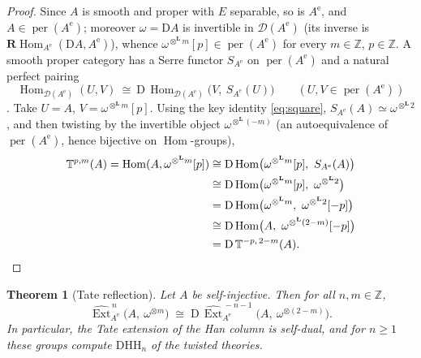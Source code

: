 \documentclass[11pt]{amsart}
\newtheorem{theorem}{Theorem}[section]
\theoremstyle{definition}
\newcommand{\T}{\mathbb{T}}
\newcommand{\HH}{\mathrm{HH}}
\newcommand{\D}{\mathrm{D}}
\newcommand{\sExt}{\widehat{\operatorname{Ext}}}
\newcommand{\Hom}{\operatorname{Hom}}
\newcommand{\rHom}{\mathbf{R}\!\operatorname{Hom}}
\newcommand{\Ae}{A^{\mathrm{e}}}
\newcommand{\der}{\mathcal{D}}
\newcommand{\per}{\operatorname{per}}
\newcommand{\Lotimes}{\otimes^{\mathbf{L}}}
\newcommand{\Z}{\mathbb{Z}}
\begin{document}
\begin{proof}
Since $A$ is smooth and proper with $E$ separable, so is $\Ae$, and
$A\in\per(\Ae)$; moreover $\omega=\D A$ is invertible in $\der(\Ae)$
\cite[Lemma 7.2]{ArmCox} (its inverse is $\rHom_{\Ae}(\D A,\Ae)$), whence
$\omega^{\Lotimes m}[p]\in\per(\Ae)$ for every $m\in\Z$, $p\in\Z$. A smooth
proper category has a Serre functor $S_{\Ae}$ on $\per(\Ae)$ and a natural
perfect pairing
\[
\Hom_{\der(\Ae)}(U,V)\ \cong\ \D\,\Hom_{\der(\Ae)}\bigl(V,\ S_{\Ae}(U)\bigr)
\qquad(U,V\in\per(\Ae))
\]
\cite{BondalKapranov,Shklyarov}. Take $U=A$, $V=\omega^{\Lotimes m}[p]$. Using
the key identity \eqref{eq:square}, $S_{\Ae}(A)\simeq\omega^{\Lotimes2}$, and
then twisting by the invertible object $\omega^{\Lotimes(-m)}$ (an
autoequivalence of $\per(\Ae)$, hence bijective on $\Hom$-groups),
\begin{align*}
\T^{p,m}(A)=\Hom(A,\omega^{\Lotimes m}[p])
&\cong\D\Hom\bigl(\omega^{\Lotimes m}[p],\ S_{\Ae}(A)\bigr)\\
&\cong\D\Hom\bigl(\omega^{\Lotimes m}[p],\ \omega^{\Lotimes2}\bigr) \\
&=\D\Hom\bigl(\omega^{\Lotimes m},\ \omega^{\Lotimes2}[-p]\bigr)\\
&\cong\D\Hom\bigl(A,\ \omega^{\Lotimes(2-m)}[-p]\bigr) \\
&=\D\,\T^{-p,\,2-m}(A). \qedhere
\end{align*}
\end{proof}

\begin{theorem}[Tate reflection]\label{thm:refltate}
Let $A$ be self-injective. Then for all $n,m\in\mathbb Z$,
\[
\sExt^{\,n}_{\Ae}\bigl(A,\ \omega^{\otimes m}\bigr)\;\cong\;
\D\,\sExt^{\,-n-1}_{\Ae}\bigl(A,\ \omega^{\otimes(2-m)}\bigr).
\]
In particular, the Tate extension of the Han column is self-dual, and for
$n\ge1$ these groups compute $\D\HH_{n}$ of the twisted theories.
\end{theorem}
\end{document}
